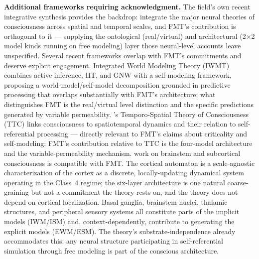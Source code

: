 \documentclass[12pt]{article}
\newcommand{\revstart}{}
\newcommand{\revend}{}
\begin{document}
{\revstart\textbf{Additional frameworks requiring acknowledgment.} The field's own recent integrative synthesis provides the backdrop: \citet{Storm2024} integrate the major neural theories of consciousness across spatial and temporal scales, and FMT's contribution is orthogonal to it --- supplying the ontological (real/virtual) and architectural (2$\times$2 model kinds running on free modeling) layer those neural-level accounts leave unspecified. Several recent frameworks overlap with FMT's commitments and deserve explicit engagement. \citet{Safron2020} Integrated World Modeling Theory (IWMT) combines active inference, IIT, and GNW with a self-modeling framework, proposing a world-model/self-model decomposition grounded in predictive processing that overlaps substantially with FMT's architecture; what distinguishes FMT is the real/virtual level distinction and the specific predictions generated by variable permeability. \citet{Northoff2017}'s Temporo-Spatial Theory of Consciousness (TTC) links consciousness to spatiotemporal dynamics and their relation to self-referential processing --- directly relevant to FMT's claims about criticality and self-modeling; FMT's contribution relative to TTC is the four-model architecture and the variable-permeability mechanism. \citet{Solms2021} work on brainstem and subcortical consciousness is compatible with FMT. The cortical automaton is a scale-agnostic characterization of the cortex as a discrete, locally-updating dynamical system operating in the Class~4 regime; the six-layer architecture is one natural coarse-graining but not a commitment the theory rests on, and the theory does not depend on cortical localization. Basal ganglia, brainstem nuclei, thalamic structures, and peripheral sensory systems all constitute parts of the implicit models (IWM/ISM) and, context-dependently, contribute to generating the explicit models (EWM/ESM). The theory's substrate-independence already accommodates this: any neural structure participating in self-referential simulation through free modeling is part of the conscious architecture.\revend}
\end{document}
